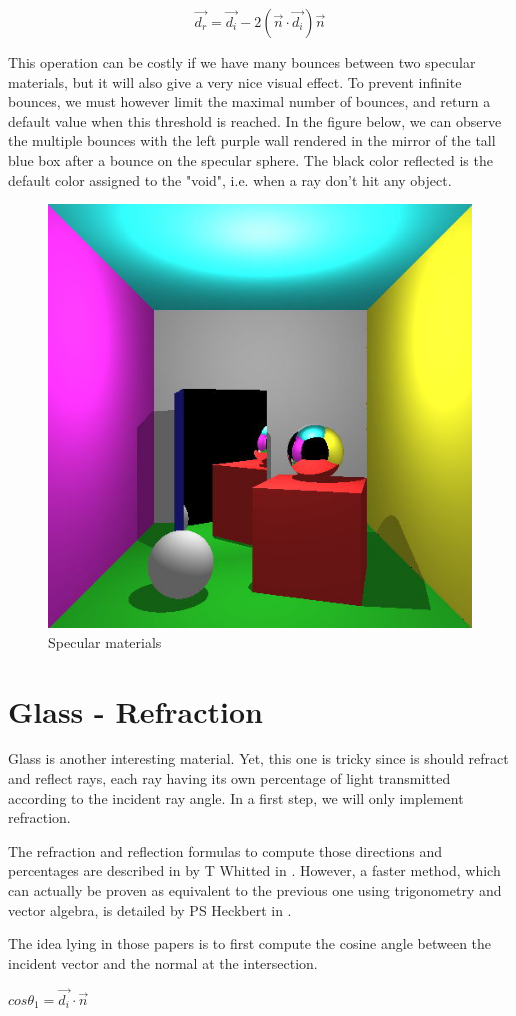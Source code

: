 \begin{equation}
\vec{d_r} = \vec{d_i} - 2 (\vec{n} \cdot \vec{d_i}) \vec{n}
\label{eq:specular}
\end{equation}

This operation can be costly if we have many bounces between two specular materials, but it will also give a very nice visual effect. To prevent infinite bounces, we must however limit the maximal number of bounces, and return a default value when this threshold is reached. In the figure below, we can observe the multiple bounces with the left purple wall rendered in the mirror of the tall blue box after a bounce on the specular sphere. The black color reflected is the default color assigned to the "void", i.e. when a ray don't hit any object.

\begin{figure}[H]
\centering
\includegraphics[width=0.35\linewidth]{img/specular.jpg}
\caption{Specular materials}
\end{figure}


\section{Glass - Refraction}
Glass is another interesting material. Yet, this one is tricky since is should refract and reflect rays, each ray having its own percentage of light transmitted according to the incident ray angle. In a first step, we will only implement refraction.

The refraction and reflection formulas to compute those directions and percentages are described in by T Whitted in \cite{whitted1979improved}. However, a faster method, which can actually be proven as equivalent to the previous one using trigonometry and vector algebra, is detailed by PS Heckbert in \cite{heckbert1989derivation}.

The idea lying in those papers is to first compute the cosine angle between the incident vector and the normal at the intersection.

$ cos\theta_1 = \vec{d_i} \cdot \vec{n} $

